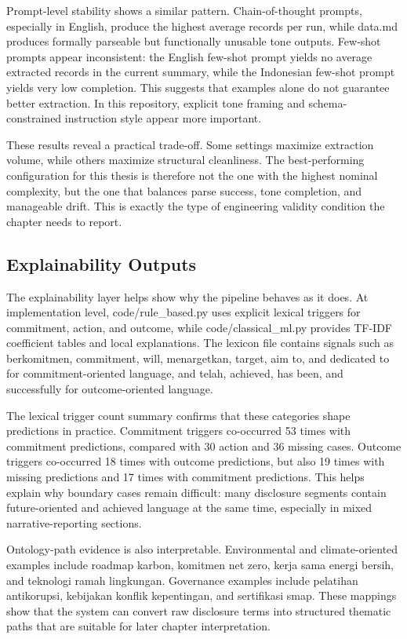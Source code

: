 Prompt-level stability shows a similar pattern. Chain-of-thought prompts, especially in English, produce the highest average records per run, while data.md produces formally parseable but functionally unusable tone outputs. Few-shot prompts appear inconsistent: the English few-shot prompt yields no average extracted records in the current summary, while the Indonesian few-shot prompt yields very low completion. This suggests that examples alone do not guarantee better extraction. In this repository, explicit tone framing and schema-constrained instruction style appear more important.

These results reveal a practical trade-off. Some settings maximize extraction volume, while others maximize structural cleanliness. The best-performing configuration for this thesis is therefore not the one with the highest nominal complexity, but the one that balances parse success, tone completion, and manageable drift. This is exactly the type of engineering validity condition the chapter needs to report.
\subsection{Explainability Outputs}

The explainability layer helps show why the pipeline behaves as it does. At implementation level, code/rule\_based.py uses explicit lexical triggers for commitment, action, and outcome, while code/classical\_ml.py provides TF-IDF coefficient tables and local explanations. The lexicon file contains signals such as berkomitmen, commitment, will, menargetkan, target, aim to, and dedicated to for commitment-oriented language, and telah, achieved, has been, and successfully for outcome-oriented language.

The lexical trigger count summary confirms that these categories shape predictions in practice. Commitment triggers co-occurred 53 times with commitment predictions, compared with 30 action and 36 missing cases. Outcome triggers co-occurred 18 times with outcome predictions, but also 19 times with missing predictions and 17 times with commitment predictions. This helps explain why boundary cases remain difficult: many disclosure segments contain future-oriented and achieved language at the same time, especially in mixed narrative-reporting sections.

Ontology-path evidence is also interpretable. Environmental and climate-oriented examples include roadmap karbon, komitmen net zero, kerja sama energi bersih, and teknologi ramah lingkungan. Governance examples include pelatihan antikorupsi, kebijakan konflik kepentingan, and sertifikasi smap. These mappings show that the system can convert raw disclosure terms into structured thematic paths that are suitable for later chapter interpretation.

